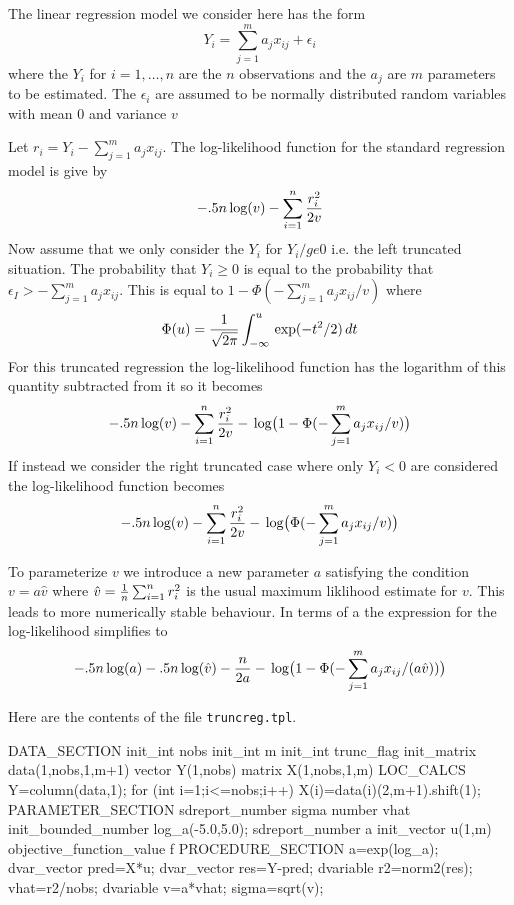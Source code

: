 

The linear regression model we consider here has the form
$$Y_i=\sum_{j=1}^m a_j x_{ij} +\epsilon_i$$
where the $Y_i$ for $i=1,\ldots,n$ are the $n$ observations
and the $a_j$ are $m$ parameters to be estimated.  
The $\epsilon_i$ are assumed to be normally distributed random 
variables with mean $0$ and variance $v$ 

Let $r_i=Y_i-\sum_{j=1}^m a_j x_{ij}$. The log-likelihood function 
for the standard regression model is give by
$$ -.5n\log(v) - \sum_{i=1}^n  {r_i^2 \over 2v}$$
Now assume that we only consider the $Y_i$ for $Y_i/ge 0$
i.e. the left truncated situation.
The probability that $Y_i\ge 0$ is equal to the probability that
$\epsilon_I>-\sum_{j=1}^m a_j x_{ij} $. This is equal to 
$1-\Phi(-\sum_{j=1}^m a_j x_{ij} /v)$ where
$$\Phi(u)={1\over\sqrt{2\pi}}\int_{-\infty}^u \exp(-t^2/2)\,dt$$
For this truncated regression the log-likelihood function
has the logarithm of this quantity subtracted from it
so it becomes 
$$ -.5n\log(v) - \sum_{i=1}^n  {r_i^2 \over 2v}
   -\log\big(1-\Phi(-\sum_{j=1}^m a_j x_{ij} /v)\big)$$
If instead we consider the right truncated case where only $Y_i<0$
are considered the log-likelihood function becomes
$$ -.5n\log(v) - \sum_{i=1}^n    {r_i^2 \over 2v}
   -\log\big(\Phi(-\sum_{j=1}^m a_j x_{ij} /v)\big)$$
 

To parameterize $v$ we introduce a new parameter $a$ satisfying
the condition $v=a\hat v$ where 
$\hat v={1\over n}\sum_{i=1}^n  r_i^2$ is the usual maximum liklihood
estimate for $v$. This leads to more
numerically stable behaviour. In terms of a the 
expression for the log-likelihood simplifies to
$$ -.5n\log(a)-.5n\log(\hat v) - {n\over 2a}
   -\log\big(1-\Phi(-\sum_{j=1}^m a_j x_{ij}/(a \hat v))\big)$$

Here are the contents of the file {\tt truncreg.tpl}.

\beginexample
DATA\_SECTION
  init\_int nobs
  init\_int m
  init\_int trunc\_flag
  init\_matrix data(1,nobs,1,m+1)
  vector Y(1,nobs)
  matrix X(1,nobs,1,m)
 LOC\_CALCS
  Y=column(data,1);
  for (int i=1;i<=nobs;i++)
  {
    X(i)=data(i)(2,m+1).shift(1);
  }
PARAMETER\_SECTION
  sdreport\_number sigma
  number vhat
  init\_bounded\_number log\_a(-5.0,5.0);
  sdreport\_number a
  init\_vector u(1,m)
  objective\_function\_value f
PROCEDURE\_SECTION
  a=exp(log\_a);
  dvar\_vector pred=X*u;
  dvar\_vector res=Y-pred;
  dvariable r2=norm2(res); 
  vhat=r2/nobs; 
  dvariable v=a*vhat;
  sigma=sqrt(v);

